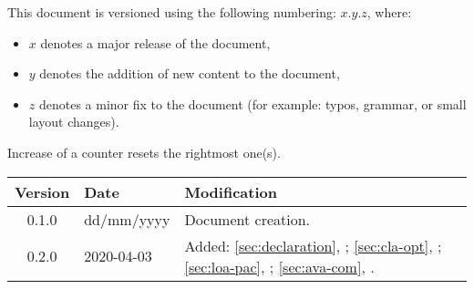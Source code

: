 \changelog
This document is versioned using the following numbering: $x.y.z$, where:
\begin{itemize}
	\item $x$ denotes a major release of the document,
	\item $y$ denotes the addition of new content to the document,
	\item $z$ denotes a minor fix to the document (for example: typos, grammar, or small layout changes).
\end{itemize}
Increase of a counter resets the rightmost one(s).
\\[\baselineskip]
\noindent
\begin{tabularx}{\textwidth}{clX}
	\toprule
	\textbf{Version} & \textbf{Date} & \textbf{Modification}\\
	\toprule
	0.1.0 & dd/mm/yyyy & Document creation.\\
	\midrule
	0.2.0 & 2020-04-03 &
		Added:
		\cref{sec:declaration}, \nameref{sec:declaration};
		\cref{sec:cla-opt}, \nameref{sec:cla-opt};
		\cref{sec:loa-pac}, \nameref{sec:loa-pac};
		\cref{sec:ava-com}, \nameref{sec:ava-com}.\\
	\bottomrule
\end{tabularx}
